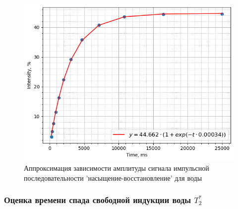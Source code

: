 \documentclass{article}
\begin{document}
\begin{itemize}
\begin{figure}[h!] \label{fig4}
    \centering
    \includegraphics[scale = 0.7]{graphs/t1_h2o_approx.png}
    \caption{ Аппроксимация зависимости амплитуды сигнала импульсной последовательности 'насыщение-восстановление' для воды}
    \label{h2o_t1_app}
    
\end{figure}

\end{itemize}


\subsubsection{Оценка времени спада свободной индукции воды $T_2^*$}
\end{document}
